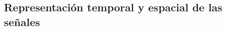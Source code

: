 \documentclass[11pt,spanish,listoffigures,listoftables]{tfgetsinf}
\begin{document}

\subsection{Representación temporal y espacial de las señales}




\end{document}
